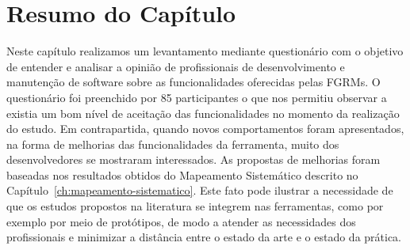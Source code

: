 \section{Resumo do Capítulo}
\label{sec:resumo_do_capitulo}

Neste capítulo realizamos um levantamento mediante questionário com o objetivo
de entender e analisar a opinião de profissionais de desenvolvimento e
manutenção de software sobre as funcionalidades oferecidas pelas FGRMs. O
questionário foi preenchido por 85 participantes o que nos permitiu observar a
existia um bom nível de aceitação das funcionalidades no momento da realização
do estudo. Em contrapartida, quando novos comportamentos foram apresentados, na
forma de melhorias das funcionalidades da ferramenta, muito dos desenvolvedores
se mostraram interessados. As propostas de melhorias foram baseadas nos
resultados obtidos do Mapeamento Sistemático descrito no
Capítulo~\ref{ch:mapeamento-sistematico}. Este fato pode ilustrar a necessidade
de que os estudos propostos na literatura se integrem nas ferramentas, como por
exemplo por meio de protótipos, de modo a atender as necessidades dos
profissionais e minimizar a distância entre o estado da arte e o estado da
prática.

